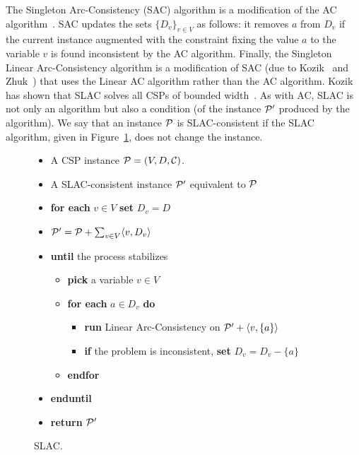 The Singleton Arc-Consistency (SAC) algorithm is a modification of
the AC algorithm~\cite{DB97}. SAC updates the sets $\{D_v\}_{v\in V}$
as follows: it removes $a$ from $D_v$ if the current
instance augmented with the constraint fixing the value $a$ to the variable $v$ is
found inconsistent by the AC algorithm. 
%
Finally, the Singleton Linear Arc-Consistency algorithm is a modification of SAC
(due to Kozik~\cite{Kozik21:sicomp} and Zhuk~\cite{Zhuk20:jacm}) that uses the
Linear AC algorithm rather than the AC algorithm. Kozik has shown that SLAC
solves all CSPs of bounded width~\cite{Kozik21:sicomp}.
%
As with AC, SLAC is not only an algorithm but also a condition (of the instance
${\mathcal P}'$ produced by the algorithm). We say that an instance
${\mathcal P}$ is SLAC-consistent if the SLAC algorithm, given in Figure~\ref{fig:slac},
does not change the instance.

\begin{figure}
\begin{itemize}\setlength\itemsep{-3pt}
\item[Input:]
A CSP instance ${\mathcal P}=(V,D,{\mathcal C})$.
\item[Output:]
A SLAC-consistent instance ${\mathcal P}'$ equivalent to ${\mathcal P}$
\item[1.]
{\bf for each} $v\in V$ {\bf set} $D_v=D$
\item[2.]
${\mathcal P}'={\mathcal P}+\sum_{v\in V}\langle v,D_v \rangle$
\item[3.]
{\bf until} the process stabilizes
\begin{itemize}
\item[3.1]
{\bf pick} a variable $v\in V$
\item[3.2]
{\bf for each} $a\in D_v$ {\bf do}
\begin{itemize}
\item[3.2.1]
{\bf run} Linear Arc-Consistency on ${\mathcal P}'+\langle v,\{a\} \rangle$
\item[3.2.2]
{\bf if} the problem is inconsistent, {\bf set} $D_v=D_v-\{a\}$
\end{itemize}
\item[]
{\bf endfor}
\end{itemize}
\item[]
{\bf enduntil}
\item[4.]
{\bf return} ${\mathcal P}'$
\end{itemize}
\vspace*{-1.2cm}
\caption{SLAC.}\label{fig:slac}
\end{figure}



